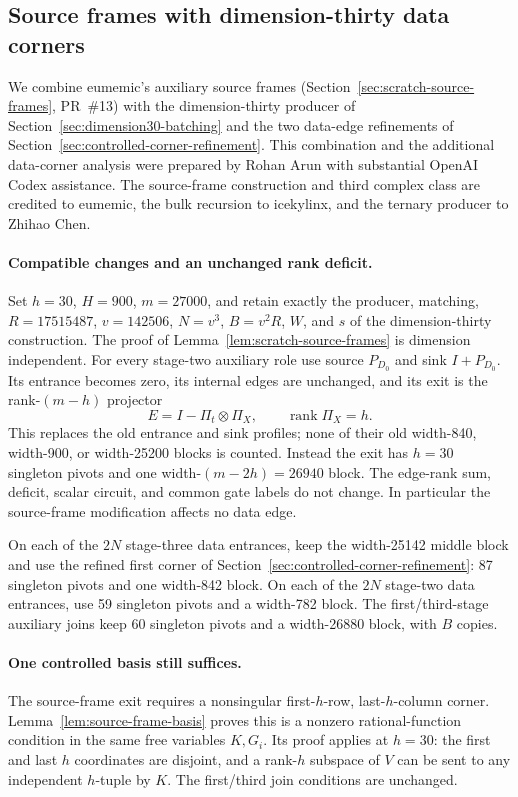 \subsection{Source frames with dimension-thirty data corners}
\label{sec:source-frame-corner-combination}

We combine eumemic's auxiliary source frames
(Section~\ref{sec:scratch-source-frames}, PR~\#13) with the dimension-thirty
producer of Section~\ref{sec:dimension30-batching} and the two data-edge
refinements of Section~\ref{sec:controlled-corner-refinement}.
This combination and the additional data-corner analysis were prepared by
Rohan Arun with substantial OpenAI Codex assistance. The source-frame
construction and third complex class are credited to eumemic, the bulk
recursion to icekylinx, and the ternary producer to Zhihao Chen.

\paragraph{Compatible changes and an unchanged rank deficit.}
Set $h=30$, $H=900$, $m=27000$, and retain exactly the producer, matching,
$R=17515487$, $v=142506$, $N=v^3$, $B=v^2R$, $W$, and $s$ of the
dimension-thirty construction. The proof of
Lemma~\ref{lem:scratch-source-frames} is dimension independent.
For every stage-two auxiliary role use source $P_{D_0}$ and sink
$I+P_{D_0}$. Its entrance becomes zero, its internal edges are unchanged,
and its exit is the rank-$(m-h)$ projector
\[
 E=I-\Pi_t\otimes\Pi_X,\qquad \operatorname{rank}\Pi_X=h.
\]
This replaces the old entrance and sink profiles; none of their old
width-840, width-900, or width-25200 blocks is counted. Instead the exit
has $h=30$ singleton pivots and one width-$(m-2h)=26940$ block.
The edge-rank sum, deficit, scalar circuit, and common gate labels do not
change. In particular the source-frame modification affects no data edge.

On each of the $2N$ stage-three data entrances, keep the width-25142
middle block and use the refined first corner of
Section~\ref{sec:controlled-corner-refinement}: 87 singleton pivots and
one width-842 block. On each of the $2N$ stage-two data entrances, use
59 singleton pivots and a width-782 block. The first/third-stage auxiliary
joins keep 60 singleton pivots and a width-26880 block, with $B$ copies.

\paragraph{One controlled basis still suffices.}
The source-frame exit requires a nonsingular first-$h$-row,
last-$h$-column corner. Lemma~\ref{lem:source-frame-basis} proves this is a
nonzero rational-function condition in the same free variables $K,G_i$.
Its proof applies at $h=30$: the first and last $h$ coordinates are
disjoint, and a rank-$h$ subspace of $V$ can be sent to any independent
$h$-tuple by $K$. The first/third join conditions are unchanged.


